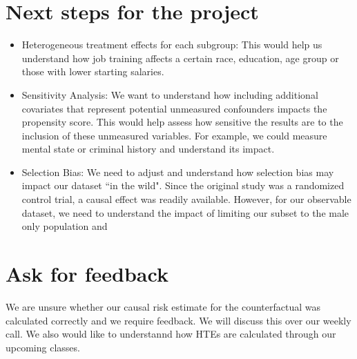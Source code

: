 \documentclass[12pt]{article}
\begin{document}
\section{Next steps for the project} \label{sec:next_steps}

\begin{itemize}[itemsep=-0.25em]
\item{Heterogeneous treatment effects for each subgroup: This would help us understand how job training affects a certain race, education, age group or those with lower starting salaries.}
\item{Sensitivity Analysis: We want to understand how including additional covariates that represent potential unmeasured confounders impacts the propensity score. This would help assess how sensitive the results are to the inclusion of these unmeasured variables. For example, we could measure mental state or criminal history and understand its impact.}
\item{Selection Bias: We need to adjust and understand how selection bias may impact our dataset ``in the wild". Since the original study was a randomized control trial, a causal effect was readily available. However, for our observable dataset, we need to understand the impact of limiting our subset to the male only population and }
\end{itemize}

\section{Ask for feedback}

We are unsure whether our causal risk estimate for the counterfactual was calculated correctly and we require feedback. We will discuss this over our weekly call. We also would like to understannd how HTEs are calculated through our upcoming classes.






\clearpage
\end{document}
